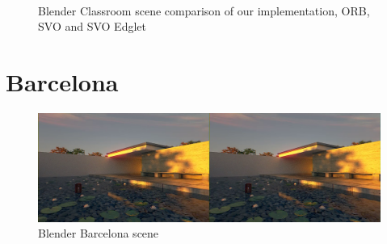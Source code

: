 \documentclass[11pt,a4paper,titlepage,oneside]{report}
\begin{document}
\begin{figure}[H]
	\centering
	\\
	\caption{Blender Classroom scene comparison of our implementation, ORB, SVO and SVO Edglet}\label{fig:blender_classroom_comp}
\end{figure}

\section{Barcelona}

\begin{figure}[H]
  \includegraphics[width=1.0\textwidth]{img/blender_barcelona_scene.png}
  \caption{Blender Barcelona scene}\label{fig:blender_barcelona_scene}
\end{figure}
\end{document}
